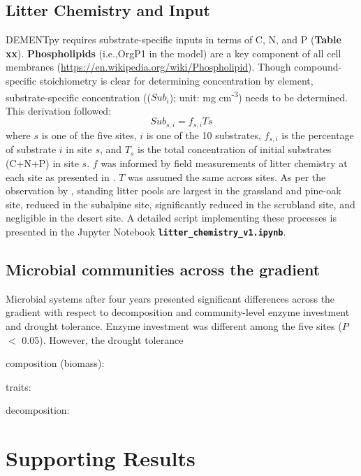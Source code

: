 \documentclass[letterpaper, 10pt]{article}
\begin{document}
\subsection{\large Litter Chemistry and Input}
DEMENTpy requires substrate-specific inputs in terms of C, N, and P (\textbf{Table xx}).
 \textbf{Phospholipids} (i.e.,OrgP1 in the model) are a key component of all cell membranes
 (\url{https://en.wikipedia.org/wiki/Phospholipid}). Though compound-specific stoichiometry
 is clear for determining concentration by element, substrate-specific concentration
 (($Sub_i$); unit: mg cm\textsuperscript{-3}) needs to be determined. This derivation followed:
\begin{equation}
  Sub_{s,i} = f_{s,i} Ts 
\end{equation}
where $s$ is one of the five sites, $i$ is one of the 10 substrates, $f_{s,i}$ is
 the percentage of substrate $i$ in site $s$, and $T_s$ is the total concentration of 
 initial substrates (C+N+P) in site $s$.  $f$ was informed by field measurements of 
 litter chemistry at each site as presented in \citet{baker2017extracellular}. $T$ was 
 assumed the same across sites. As per the observation by \citet{baker2017extracellular}, 
 standing litter pools are largest in the grassland and pine-oak site, reduced in the
 subalpine site, significantly reduced in the scrubland site, and negligible in the desert
 site. A detailed script implementing these processes is presented in the Jupyter Notebook 
 \textbf{\texttt{litter\_chemistry\_v1.ipynb}}.


\subsection{Microbial communities across the gradient}
Microbial systems after four years presented significant differences across the gradient
with respect to decomposition and community-level enzyme investment and drought tolerance.
Enzyme investment was different among the five sites ($P$ $<$ 0.05). However, the drought tolerance

composition (biomass):

traits:

decomposition:




\section{Supporting Results}
\end{document}
